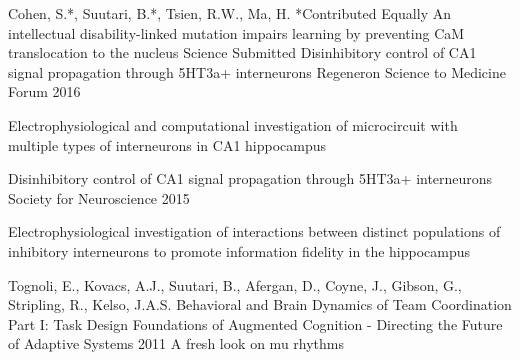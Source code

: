 


\begin{cventries}


\cventry
{Cohen, S.*, Suutari, B.*, Tsien, R.W., Ma, H. \newline \mbox{*}Contributed Equally} %
{An intellectual disability-linked mutation impairs learning by preventing CaM translocation to the nucleus} %
{Science} %
{Submitted} %
{ %
}
\cventry
{} %
{Disinhibitory control of CA1 signal propagation through 5HT3a+ interneurons} %
{Regeneron Science to Medicine Forum} %
{2016} %
{ %
\begin{cvitems}
\item {Electrophysiological and computational investigation of microcircuit with multiple types of interneurons in CA1 hippocampus}
\end{cvitems}
}
\cventry
{} %
{Disinhibitory control of CA1 signal propagation through 5HT3a+ interneurons} %
{Society for Neuroscience} %
{2015} %
{ %
\begin{cvitems}
\item {Electrophysiological investigation of interactions between distinct populations of inhibitory interneurons to promote information fidelity in the hippocampus}
\end{cvitems}
}
\cventry
{Tognoli, E., Kovacs, A.J., Suutari, B., Afergan, D., Coyne, J., Gibson, G., Stripling, R., Kelso, J.A.S.} %
{Behavioral and Brain Dynamics of Team Coordination Part I: Task Design} %
{Foundations of Augmented Cognition - Directing the Future of Adaptive Systems} %
{2011} %
{ %
}
\cventry
{} %
{A fresh look on mu rhythms} %

\end{cventries}
